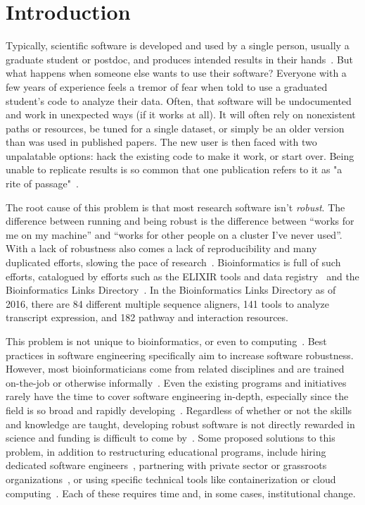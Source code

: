 \documentclass[10pt,letterpaper]{article}
\begin{document}
\section*{Introduction}

Typically, scientific software is developed and used by a single person,
usually a graduate student or postdoc, and produces intended results in their
hands~\cite{prins2015}. 
But what happens
when someone else wants to use their software? Everyone with
a few years of experience feels a tremor of fear when told to use
a graduated student's code to analyze their data.
Often, that software will be undocumented and work in unexpected
ways (if it works at all).  It will often rely on nonexistent paths or resources,
be tuned for a single dataset,
or simply be an older version than was used in published papers.
The new user is then faced with two unpalatable options:
hack the existing code to make it work, or start over. Being unable to
replicate results is so common that one publication refers to it as "a rite of
passage"~\cite{baker2016}. 

The root cause of this problem is that most research software
isn't \emph{robust}. The difference between running and being
robust is the difference between ``works for me on my machine'' and
``works for other people on a cluster I've never used''. With a lack of
robustness also comes a lack of reproducibility and many duplicated efforts,
slowing the pace of research~\cite{prabhu2011,lawlor2015}.
Bioinformatics is full of such efforts, catalogued by efforts such as
the ELIXIR tools and data registry~\cite{ison2016}
and the Bioinformatics Links Directory~\cite{brazas2012}. In the Bioinformatics
Links Directory as of 2016, there are 84 different multiple sequence aligners, 141 tools
to analyze transcript expression, and 182 pathway and interaction resources.

This problem is not unique to bioinformatics, or even to computing~\cite{baker2016}. 
Best practices in software engineering specifically aim to increase software
robustness. However, most bioinformaticians come from related disciplines and
are trained on-the-job or otherwise informally~\cite{prins2015,atwood2015}. Even
the existing programs and initiatives rarely have the time to cover software engineering
in-depth, especially since the field is so broad and rapidly
developing~\cite{atwood2015,lawlor2015}. Regardless of whether or not the skills
and knowledge are taught, developing robust software is not directly rewarded
in science and funding is difficult to come by~\cite{prins2015}. Some proposed
solutions to this problem, in addition to restructuring educational programs,
include hiring dedicated software engineers~\cite{lawlor2015,sanders2008},
partnering with private sector or grassroots organizations~\cite{prins2015,ison2016},
or using specific technical tools like containerization or cloud
computing~\cite{afgan2016,howe2012}. Each of these requires time and, in some
cases, institutional change.
\end{document}

